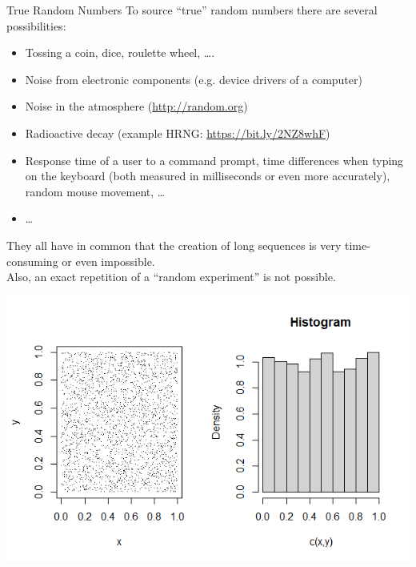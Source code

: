 \begin{vbframe}{True Random Numbers}
To source \enquote{true} random numbers there are several possibilities:
\begin{itemize}
  \item Tossing a coin, dice, roulette wheel, \ldots.
  \item Noise from electronic components (e.g. device drivers of a computer)
  \item Noise in the atmosphere (\url{http://random.org})
  \item Radioactive decay (example HRNG: \url{https://bit.ly/2NZ8whF})
  \item Response time of a user to a command prompt, time differences when typing on the keyboard (both measured in milliseconds or even more accurately),
    random mouse movement, \ldots
  \item \ldots
\end{itemize}
They all have in common that the creation of long sequences is very time-consuming or even impossible.\\
\medskip
Also, an exact repetition of a \enquote{random experiment} is not possible.

\framebreak

\begin{center}
\includegraphics[width =1\textwidth]{figure_man/random.png}
\end{center}


\end{vbframe}

